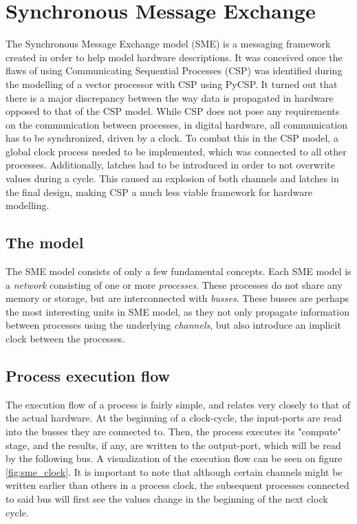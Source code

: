 \section{Synchronous Message Exchange} 
The Synchronous Message Exchange
model (SME) is a messaging framework created in order to help model
hardware descriptions\cite{sme_for_hardware_designs}.  It was conceived
once the flaws of using Communicating Sequential Processes (CSP) was
identified during the modelling of a vector processor with CSP using
PyCSP\cite{PyCSP}.  It turned out that there is a major discrepancy
between the way data is propagated in hardware opposed to that of the
CSP model. While CSP does not pose any requirements on the communication
between processes, in digital hardware, all communication has to be
synchronized, driven by a clock. To combat this in the CSP model, a
global clock process needed to be implemented, which was connected to
all other processes. Additionally, latches had to be introduced in order
to not overwrite values during a cycle. This caused an explosion of both
channels and latches in the final design, making CSP a much less viable
framework for hardware modelling\cite{sme_for_hardware_designs}.

\subsection{The model} The SME model consists of only a few fundamental
concepts. Each SME model is a \textit{network} consisting of one or more
\textit{processes}. These processes do not share any memory or storage,
but are interconnected with \textit{busses}.  These busses are perhaps
the most interesting units in SME model, as they not only propagate
information between processes using the underlying \textit{channels},
but also introduce an implicit clock between the processes.\\

\subsection{Process execution flow} The execution flow of a process is
fairly simple, and relates very closely to that of the actual hardware. At
the beginning of a clock-cycle, the input-ports are read into the busses
they are connected to. Then, the process executes its "compute" stage, and
the results, if any, are written to the output-port, which will be read
by the following bus. A visualization of the execution flow can be seen
on figure \ref{fig:sme_clock}.  
It is important to note that although certain channels might be written earlier
than others in a process clock, the subsequent processes connected to said bus 
will first see the values change in the beginning of the next clock cycle.


